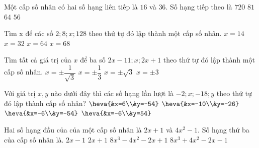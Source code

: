 \begin{ex}%
	Một cấp số nhân có hai số hạng liên tiếp là $16$ và $36$. Số hạng tiếp theo là
	\choice
	{$720$}
	{\True$81$}
	{$64$}
	{$56$}
\end{ex}
\begin{ex}%
	Tìm x để các số $2;8;x;128$ theo thứ tự đó lập thành một cấp số nhân.
	\choice
	{$x=14$}
	{\True 
		$x=32$}
	{$x=64$}
	{$x=68$}
\end{ex}
\begin{ex}%
	Tìm tất cả giá trị của $x$ để ba số $2x-11;x;2x+1$ theo thứ tự đó lập thành một cấp số nhân.
	\choice
	{\True $x=\pm\dfrac{1}{\sqrt{3}}$}
	{$x=\pm\dfrac{1}{3}$}
	{$x=\pm\sqrt{3}$}
	{$x=\pm3$}
\end{ex}
\begin{ex}%
	Với giá trị $x,y$ nào dưới đây thì các số hạng lần lượt là $-2;x;-18;y$ theo thứ tự đó lập thành cấp số nhân?
	\choice
	{$\heva{&x=6\\&y=-54}$}
	{$\heva{&x=-10\\&y=-26}$}
	{\True $\heva{&x=-6\\&y=-54}$}
	{$\heva{&x=-6\\&y=54}$}
\end{ex}
\begin{ex}%
	Hai số hạng đầu của của một cấp số nhân là $2x+1$ và $4x^2-1$. Số hạng thứ ba của cấp số nhân là.
	\choice
	{$2x-1$}
	{$2x+1$}
	{\True $8x^3-4x^2-2x+1$}
	{$8x^3+4x^2-2x-1$}
\end{ex}
